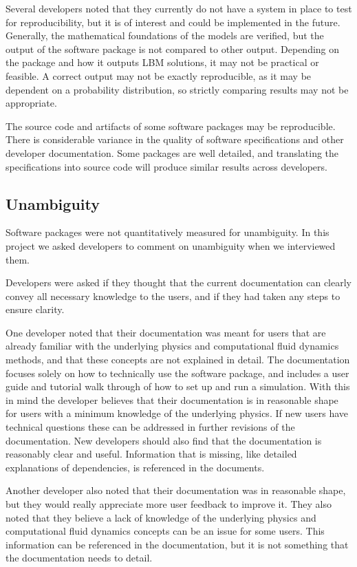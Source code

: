 \documentclass[12pt, notitlepage]{article}
\begin{document}
Several developers noted that they currently do not have a system in place to test for reproducibility, but it is of interest and could be implemented in the future. Generally, the mathematical foundations of the models are verified, but the output of the software package is not compared to other output. Depending on the package and how it outputs LBM solutions, it may not be practical or feasible. A correct output may not be exactly reproducible, as it may be dependent on a probability distribution, so strictly comparing results may not be appropriate. 

The source code and artifacts of some software packages may be reproducible. There is considerable variance in the quality of software specifications and other developer documentation. Some packages are well detailed, and translating the specifications into source code will produce similar results across developers. 

\subsection{Unambiguity}

Software packages were not quantitatively measured for unambiguity.
In this project we asked developers to comment on unambiguity when we interviewed them.

Developers were asked if they thought that the current documentation can clearly convey all necessary knowledge to the users, and if they had taken any steps to ensure clarity. 

One developer noted that their documentation was meant for users that are already familiar with the underlying physics and computational fluid dynamics methods, and that these concepts are not explained in detail. The documentation focuses solely on how to technically use the software package, and includes a user guide and tutorial walk through of how to set up and run a simulation. With this in mind the developer believes that their documentation is in reasonable shape for users with a minimum knowledge of the underlying physics. If new users have technical questions these can be addressed in further revisions of the documentation. New developers should also find that the documentation is reasonably clear and useful. Information that is missing, like detailed explanations of dependencies, is referenced in the documents. 

Another developer also noted that their documentation was in reasonable shape, but they would really appreciate more user feedback to improve it. They also noted that they believe a lack of knowledge of the underlying physics and computational fluid dynamics concepts can be an issue for some users. This information can be referenced in the documentation, but it is not something that the documentation needs to detail. 
\end{document}
